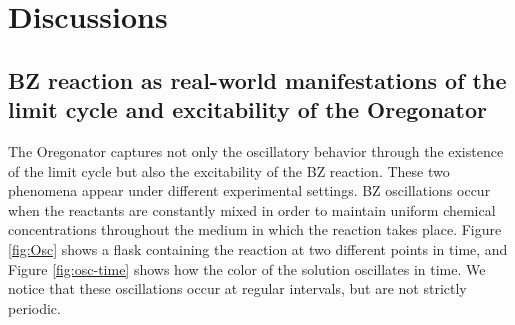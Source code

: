 \documentclass[twocolumn,amsmath,amssymb,aps]{revtex4}
\begin{document}
\section{Discussions}


\subsection{BZ reaction as real-world manifestations of the limit cycle and excitability of the Oregonator}

The Oregonator captures not only the oscillatory behavior through the existence of the limit cycle but also the excitability of the BZ reaction. These two phenomena appear under different experimental settings. BZ oscillations occur when the reactants are constantly mixed in order to maintain uniform chemical concentrations throughout the medium in which the reaction takes place.  Figure \ref{fig:Osc} shows a flask containing the reaction at two different points in time, and Figure \ref{fig:osc-time} shows how the color of the solution oscillates in time. We notice that these oscillations occur at regular intervals, but are not strictly periodic. 
\end{document}
